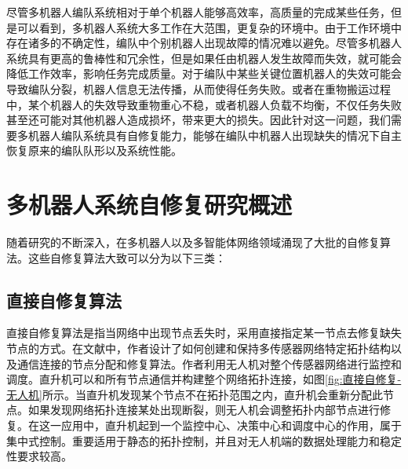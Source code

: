 尽管多机器人编队系统相对于单个机器人能够高效率，高质量的完成某些任务，但是可以看到，多机器人系统大多工作在大范围，更复杂的环境中。由于工作环境中存在诸多的不确定性，编队中个别机器人出现故障的情况难以避免。尽管多机器人系统具有更高的鲁棒性和冗余性，但是如果任由机器人发生故障而失效，就可能会降低工作效率，影响任务完成质量。对于编队中某些关键位置机器人的失效可能会导致编队分裂，机器人信息无法传播，从而使得任务失败。或者在重物搬运过程中，某个机器人的失效导致重物重心不稳，或者机器人负载不均衡，不仅任务失败甚至还可能对其他机器人造成损坏，带来更大的损失。因此针对这一问题，我们需要多机器人编队系统具有自修复能力，能够在编队中机器人出现缺失的情况下自主恢复原来的编队队形以及系统性能。

\section{多机器人系统自修复研究概述}
随着研究的不断深入，在多机器人以及多智能体网络领域涌现了大批的自修复算法。这些自修复算法大致可以分为以下三类\supercite{张飞2010}：

\subsection{直接自修复算法}
直接自修复算法是指当网络中出现节点丢失时，采用直接指定某一节点去修复缺失节点的方式。在文献\parencite{corke2004autonomous}中，作者设计了如何创建和保持多传感器网络特定拓扑结构以及通信连接的节点分配和修复算法。作者利用无人机对整个传感器网络进行监控和调度。直升机可以和所有节点通信并构建整个网络拓扑连接，如图\ref{fig:直接自修复-无人机}所示。当直升机发现某个节点不在拓扑范围之内，直升机会重新分配此节点。如果发现网络拓扑连接某处出现断裂，则无人机会调整拓扑内部节点进行修复。在这一应用中，直升机起到一个监控中心、决策中心和调度中心的作用，属于集中式控制。重要适用于静态的拓扑控制，并且对无人机端的数据处理能力和稳定性要求较高。

